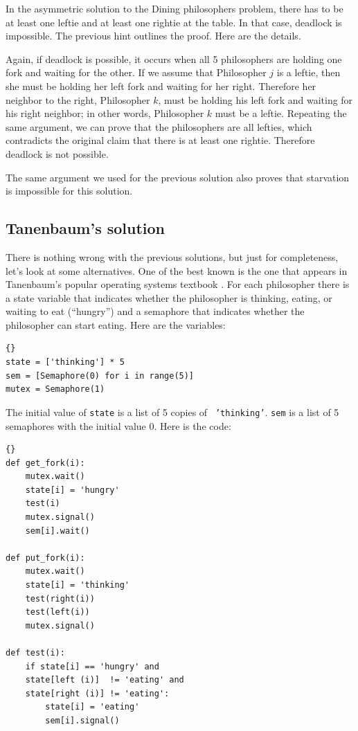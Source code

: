 \documentclass{book}
\newcommand{\clearemptydoublepage}{\newpage\cleardoublepage}
\begin{document}
In the asymmetric solution to the Dining philosophers problem,
there has to be at least one leftie and at least one rightie at
the table.  In that case, deadlock is impossible.  The previous
hint outlines the proof.  Here are the details.

Again, if deadlock is possible, it occurs when all 5 philosophers
are holding one fork and waiting for the other.  If we assume that
Philosopher $j$ is a leftie, then she must be holding her left
fork and waiting for her right.  Therefore her neighbor to the right,
Philosopher $k$, must be holding his left fork and waiting for
his right neighbor; in other words, Philosopher $k$ must be a leftie.
Repeating the same argument, we can prove that the philosophers
are all lefties, which contradicts the original claim that there
is at least one rightie.  Therefore deadlock is not possible.

The same argument we used for the previous solution also proves
that starvation is impossible for this solution.


\clearemptydoublepage
\subsection{Tanenbaum's solution}

There is nothing wrong with the previous solutions, but just for
completeness, let's look at some alternatives.  One of the best known
is the one that appears in Tanenbaum's popular operating systems
textbook \cite{tanenbaum}.
For each philosopher there is a state variable that
indicates whether the philosopher is thinking, eating, or waiting to
eat (``hungry'') and a semaphore that indicates whether the
philosopher can start eating.  Here are the variables:

\begin{lstlisting}[title={Variables for Tanenbaum's solution}]{}
state = ['thinking'] * 5
sem = [Semaphore(0) for i in range(5)]
mutex = Semaphore(1)
\end{lstlisting}

The initial value of {\tt state} is a list of 5 copies of {\tt
'thinking'}.  {\tt sem} is a list of 5 semaphores with the initial
value 0.  Here is the code:

\begin{lstlisting}[title={Tanenbaum's solution}]{}
def get_fork(i):
    mutex.wait()
    state[i] = 'hungry'
    test(i)
    mutex.signal()
    sem[i].wait()

def put_fork(i):
    mutex.wait()
    state[i] = 'thinking'
    test(right(i))
    test(left(i))
    mutex.signal()

def test(i):
    if state[i] == 'hungry' and
    state[left (i)]  != 'eating' and
    state[right (i)] != 'eating':
        state[i] = 'eating'
        sem[i].signal()
\end{lstlisting}
\end{document}

